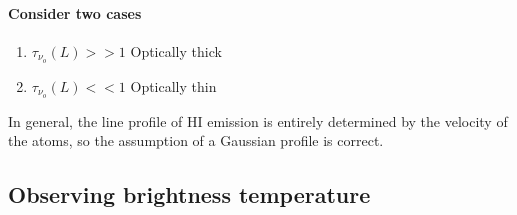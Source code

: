 \documentclass[12pt]{article}
\newcommand{\mar}[1]{\hspace{0pt}\marginpar{-\textcolor{black}{#1}-}}
\begin{document}
\mar{39}
\paragraph{Consider two cases}
\begin{enumerate}[label={(\roman*)}]
    \item $\tau_{\nu_{o}}(L) >> 1$ Optically thick
    \item $\tau_{\nu_{o}}(L) << 1$ Optically thin
\end{enumerate}
In general, the line profile of HI emission is entirely determined by the velocity
of the atoms, so the assumption of a Gaussian profile is correct.

\mar{40}
\subsection{Observing brightness temperature}
\end{document}
